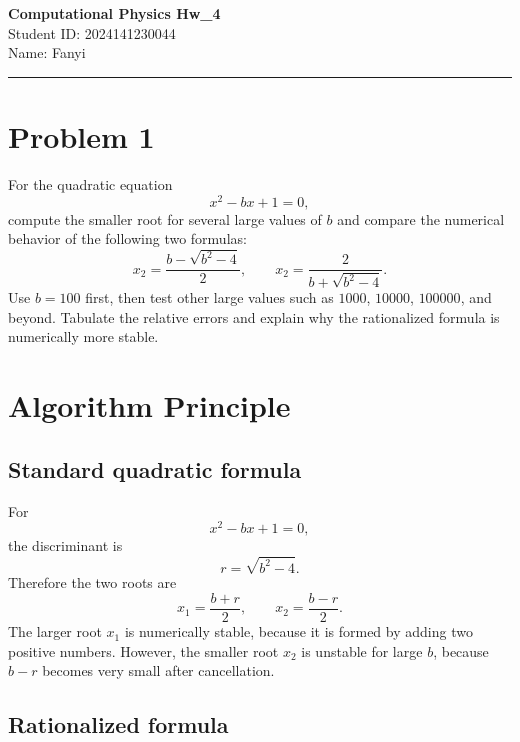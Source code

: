 \documentclass[12pt,a4paper]{article}
\newcommand{\HomeworkTitle}{Computational Physics Hw\_4}
\newcommand{\StudentID}{2024141230044}
\newcommand{\StudentName}{Fanyi}
\begin{document}
\begin{center}
    {\LARGE \textbf{\HomeworkTitle}}\\[1.2em]
    {\large Student ID: \StudentID}\\[0.5em]
    {\large Name: \StudentName}
\end{center}

\vspace{0.5em}
\noindent\rule{\textwidth}{0.8pt}
\vspace{0.5em}

\section*{Problem 1}

For the quadratic equation
\[
 x^2-bx+1=0,
\]
compute the smaller root for several large values of $b$ and compare the numerical behavior of the following two formulas:
\[
 x_2 = \frac{b-\sqrt{b^2-4}}{2},
 \qquad
 x_2 = \frac{2}{b+\sqrt{b^2-4}}.
\]
Use $b=100$ first, then test other large values such as $1000$, $10000$, $100000$, and beyond. Tabulate the relative errors and explain why the rationalized formula is numerically more stable.

\newpage
\tableofcontents
\newpage

\section{Algorithm Principle}

\subsection*{Standard quadratic formula}

For
\[
 x^2-bx+1=0,
\]
the discriminant is
\[
 r = \sqrt{b^2-4}.
\]
Therefore the two roots are
\[
 x_1=\frac{b+r}{2},
 \qquad
 x_2=\frac{b-r}{2}.
\]
The larger root $x_1$ is numerically stable, because it is formed by adding two positive numbers. However, the smaller root $x_2$ is unstable for large $b$, because $b-r$ becomes very small after cancellation.

\subsection*{Rationalized formula}
\end{document}
